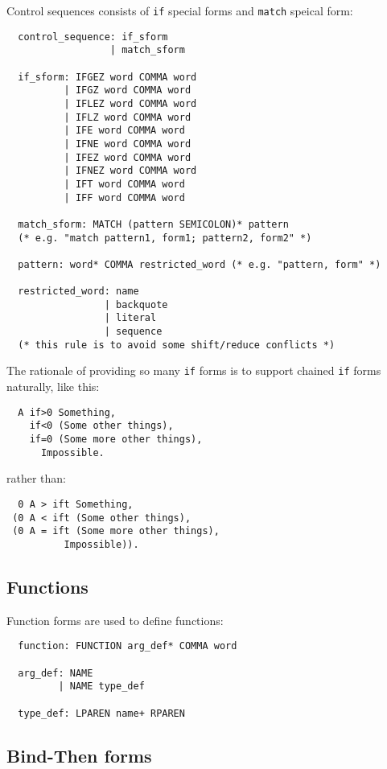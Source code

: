 \documentclass{article}
\begin{document}
Control sequences consists of \texttt{if} special forms and \texttt{match} speical form:
\begin{verbatim}
  control_sequence: if_sform
                  | match_sform

  if_sform: IFGEZ word COMMA word
          | IFGZ word COMMA word
          | IFLEZ word COMMA word
          | IFLZ word COMMA word
          | IFE word COMMA word
          | IFNE word COMMA word
          | IFEZ word COMMA word
          | IFNEZ word COMMA word
          | IFT word COMMA word
          | IFF word COMMA word

  match_sform: MATCH (pattern SEMICOLON)* pattern
  (* e.g. "match pattern1, form1; pattern2, form2" *)

  pattern: word* COMMA restricted_word (* e.g. "pattern, form" *)

  restricted_word: name
                 | backquote
                 | literal
                 | sequence
  (* this rule is to avoid some shift/reduce conflicts *)
\end{verbatim}

The rationale of providing so many \texttt{if} forms is to support chained \texttt{if} forms naturally, like this:
\begin{verbatim}
  A if>0 Something,
    if<0 (Some other things),
    if=0 (Some more other things),
      Impossible.
\end{verbatim}

rather than:
\begin{verbatim}
  0 A > ift Something,
 (0 A < ift (Some other things),
 (0 A = ift (Some more other things),
          Impossible)).
\end{verbatim}

\subsection{Functions}

Function forms are used to define functions:
\begin{verbatim}
  function: FUNCTION arg_def* COMMA word

  arg_def: NAME
         | NAME type_def

  type_def: LPAREN name+ RPAREN
\end{verbatim}

\subsection{Bind-Then forms}
\end{document}
